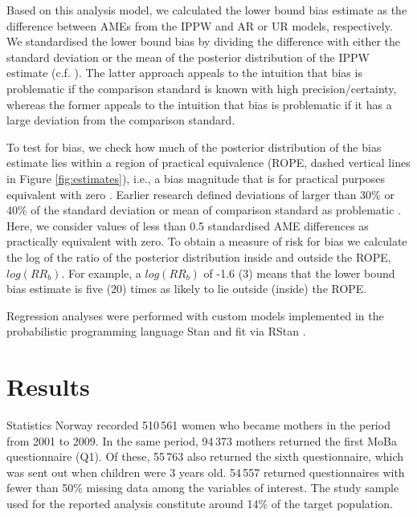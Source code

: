 \documentclass[12pt]{article}
\begin{document}
Based on this analysis model, we calculated the lower bound bias estimate as the difference between AMEs from the IPPW and AR or UR models, respectively. We standardised the lower bound bias by dividing the difference with either the standard deviation or the mean of the posterior distribution of the IPPW estimate (c.f. \cite{Stuart2010-cj,Nilsen2009-ci}). The latter approach appeals to the intuition that bias is problematic if the comparison standard is known with high precision/certainty, whereas the former appeals to the intuition that bias is problematic if it has a large deviation from the comparison standard. 

To test for bias, we check how much of the posterior distribution of the bias estimate lies within a region of practical equivalence (ROPE, dashed vertical lines in Figure \ref{fig:estimates}), i.e., a bias magnitude that is for practical purposes equivalent with zero \cite{Mascha2011-um}. Earlier research defined deviations of larger than 30\% or 40\% of the standard deviation or mean of comparison standard as problematic \cite{Stuart2010-cj,Nohr2006-uf}. Here, we consider values of less than 0.5 standardised AME differences as practically equivalent with zero. To obtain a measure of risk for bias we calculate the log of the ratio of the posterior distribution inside and outside the ROPE, $log(RR_b)$. For example, a $log(RR_b)$ of -1.6 (3) means that the lower bound bias estimate is five (20) times as likely to lie outside (inside) the ROPE.

Regression analyses were performed with custom models implemented in the probabilistic programming language Stan \cite{Stan_Development_Team2017-lp} and fit via RStan \cite{Stan_Development_Team_2018-rs}.

\section{Results}

Statistics Norway recorded 510\,561 women who became mothers in the period from 2001 to 2009. In the same period, 94\,373 mothers returned the first MoBa questionnaire (Q1). Of these, 55\,763 also returned the sixth questionnaire,  which was sent out when  children were 3 years old. 54\,557 returned questionnaires with fewer than 50\% missing data among the variables of interest. The study sample used for the reported analysis constitute around 14\% of the target population.
\end{document}
